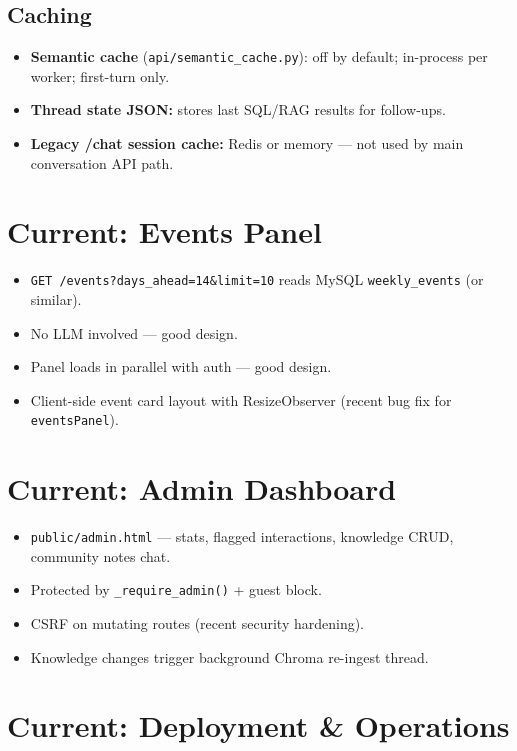 \documentclass[11pt,a4paper]{article}
\begin{document}
\subsection{Caching}
\begin{itemize}
  \item \textbf{Semantic cache} (\texttt{api/semantic\_cache.py}): off by default; in-process per worker; first-turn only.
  \item \textbf{Thread state JSON:} stores last SQL/RAG results for follow-ups.
  \item \textbf{Legacy /chat session cache:} Redis or memory --- not used by main conversation API path.
\end{itemize}

\section{Current: Events Panel}

\begin{itemize}
  \item \texttt{GET /events?days\_ahead=14\&limit=10} reads MySQL \texttt{weekly\_events} (or similar).
  \item No LLM involved --- good design.
  \item Panel loads in parallel with auth --- good design.
  \item Client-side event card layout with ResizeObserver (recent bug fix for \texttt{eventsPanel}).
\end{itemize}

\section{Current: Admin Dashboard}

\begin{itemize}
  \item \texttt{public/admin.html} --- stats, flagged interactions, knowledge CRUD, community notes chat.
  \item Protected by \texttt{\_require\_admin()} + guest block.
  \item CSRF on mutating routes (recent security hardening).
  \item Knowledge changes trigger background Chroma re-ingest thread.
\end{itemize}

\section{Current: Deployment \& Operations}
\end{document}
